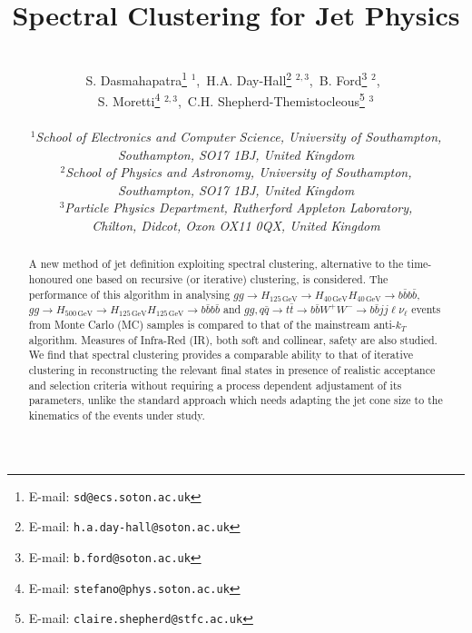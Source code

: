 \documentclass[12pt]{article}
\begin{document}
%


\title{\hfill ~\\[-50mm]
                  \textbf{Spectral Clustering for Jet Physics
                }        }

\author{\\[-5mm]
S. Dasmahapatra\footnote{E-mail: {\tt sd@ecs.soton.ac.uk}} $^{1}$,\
H.A. Day-Hall\footnote{E-mail: {\tt h.a.day-hall@soton.ac.uk}} $^{2,3}$,\
B. Ford\footnote{E-mail: {\tt b.ford@soton.ac.uk}} $^{2}$,\ \\
S. Moretti\footnote{E-mail: {\tt stefano@phys.soton.ac.uk}} $^{2,3}$,\
C.H. Shepherd-Themistocleous\footnote{E-mail: {\tt claire.shepherd@stfc.ac.uk}} $^{3}$
\\ \\
\emph{\small $^1$School of Electronics and Computer Science, University of Southampton,}\\
\emph{\small Southampton, SO17 1BJ, United Kingdom}\\
\emph{\small $^2$School of Physics and Astronomy, University of Southampton,}\\
\emph{\small Southampton, SO17 1BJ, United Kingdom}\\
\emph{\small  $^3$Particle Physics Department, Rutherford Appleton Laboratory,}\\
\emph{\small Chilton, Didcot, Oxon OX11 0QX, United Kingdom}\\[4mm]
 }
%
\maketitle
%
\vspace*{-10mm}
%
\begin{abstract}
\noindent
{A new method of jet definition exploiting  spectral clustering, alternative to the time-honoured one based on recursive (or iterative) clustering,  is considered.
 The performance of this algorithm in analysing  
\(gg\to H_{125\,\text{GeV}} \rightarrow H_{40\,\text{GeV}} H_{40\,\text{GeV}} \rightarrow b \bar{b} b \bar{b}\),
\(gg\to H_{500\,\text{GeV}} \rightarrow H_{125\,\text{GeV}} H_{125\,\text{GeV}} \rightarrow b \bar{b} b \bar{b}\)
and
\(gg,q\bar q\to t\bar t\to b\bar b W^+W^-\to b\bar b jj \ell\nu_\ell\) events from 
 Monte Carlo (MC) samples is compared to that of the mainstream anti-$k_T$ algorithm.
 Measures of Infra-Red (IR), both soft and collinear, safety are also studied. We find that spectral clustering provides a comparable ability to that of
iterative clustering in reconstructing the relevant final states in presence of realistic acceptance and selection criteria without requiring a 
process dependent adjustament of its parameters, unlike the standard approach which needs adapting the jet cone size to the  kinematics of the events  under study.}
 \end{abstract}
\thispagestyle{empty}
\vfill
\newpage
%
    
    \FloatBarrier
    
    \FloatBarrier
    
    \FloatBarrier
    
    \FloatBarrier
    
    \FloatBarrier
\end{document}
